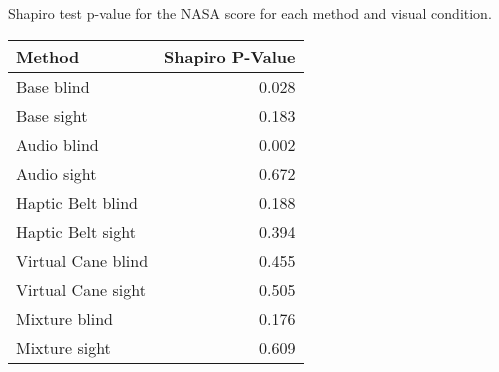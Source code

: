 
\centering
\caption{Shapiro test p-value for the NASA score for each method and visual condition.}
\label{tab:shapiro_nasa_score}
\begin{tabular}{lr}
\toprule
            Method &  Shapiro P-Value \\
\midrule
        Base blind &            0.028 \\
        Base sight &            0.183 \\
       Audio blind &            0.002 \\
       Audio sight &            0.672 \\
 Haptic Belt blind &            0.188 \\
 Haptic Belt sight &            0.394 \\
Virtual Cane blind &            0.455 \\
Virtual Cane sight &            0.505 \\
     Mixture blind &            0.176 \\
     Mixture sight &            0.609 \\
\bottomrule
\end{tabular}
